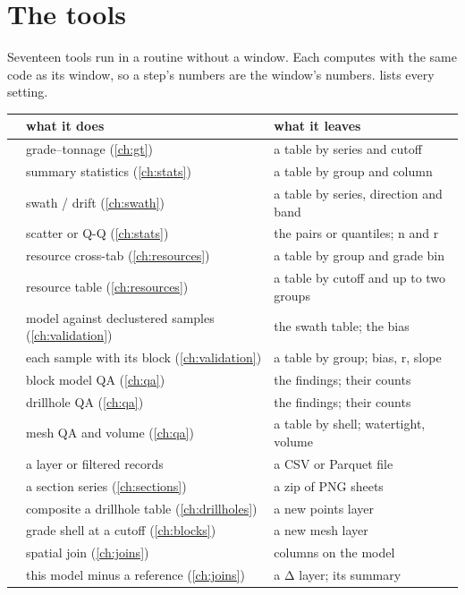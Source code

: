 \section{The tools}\label{sec:routines-tools}
Seventeen tools run in a routine without a window. Each computes with the same code as its window, so a step's numbers are the window's numbers.  lists every setting.

\begin{tabularx}{\linewidth}{@{}lLL@{}}\toprule
{} & what it does & what it leaves \\ \midrule
{} & grade–tonnage (\cref{ch:gt}) & a table by series and cutoff \\
 & summary statistics (\cref{ch:stats}) & a table by group and column \\
 & swath / drift (\cref{ch:swath}) & a table by series, direction and band \\
 & scatter or Q-Q (\cref{ch:stats}) & the pairs or quantiles; n and r \\
 & resource cross-tab (\cref{ch:resources}) & a table by group and grade bin \\
 & resource table (\cref{ch:resources}) & a table by cutoff and up to two groups \\
 & model against declustered samples (\cref{ch:validation}) & the swath table; the bias \\
 & each sample with its block (\cref{ch:validation}) & a table by group; bias, r, slope \\
 & block model QA (\cref{ch:qa}) & the findings; their counts \\
 & drillhole QA (\cref{ch:qa}) & the findings; their counts \\
 & mesh QA and volume (\cref{ch:qa}) & a table by shell; watertight, volume \\
 & a layer or filtered records & a CSV or Parquet file \\
 & a section series (\cref{ch:sections}) & a zip of PNG sheets \\
 & composite a drillhole table (\cref{ch:drillholes}) & a new points layer \\
 & grade shell at a cutoff (\cref{ch:blocks}) & a new mesh layer \\
 & spatial join (\cref{ch:joins}) & columns on the model \\
 & this model minus a reference (\cref{ch:joins}) & a Δ layer; its summary \\
\bottomrule
\end{tabularx}

